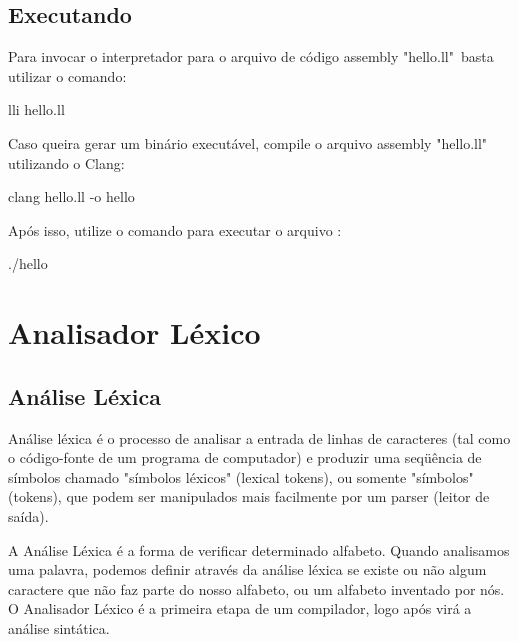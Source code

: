 \documentclass[12pt,a4paper,twoside]{report}
\begin{document}
\section{Executando}

Para invocar o interpretador para o arquivo de código assembly "hello.ll"\, basta utilizar o comando:

\begin{terminal}
lli hello.ll
\end{terminal}

Caso queira gerar um binário executável, compile o arquivo assembly "hello.ll"\, utilizando o Clang:

\begin{terminal}
clang hello.ll -o hello
\end{terminal}

Após isso, utilize o comando para executar o arquivo :

\begin{terminal}
./hello
\end{terminal}

\chapter{Analisador Léxico}

\section{Análise Léxica}

Análise léxica é o processo de analisar a entrada de linhas de caracteres (tal como o código-fonte de um programa de computador) e produzir uma seqüência de símbolos chamado "símbolos léxicos" (lexical tokens), ou somente "símbolos" (tokens), que podem ser manipulados mais facilmente por um parser (leitor de saída).

A Análise Léxica é a forma de verificar determinado alfabeto. Quando analisamos uma palavra, podemos definir através da análise léxica se existe ou não algum caractere que não faz parte do nosso alfabeto, ou um alfabeto inventado por nós. O Analisador Léxico é a primeira etapa de um compilador, logo após virá a análise sintática.
\end{document}
